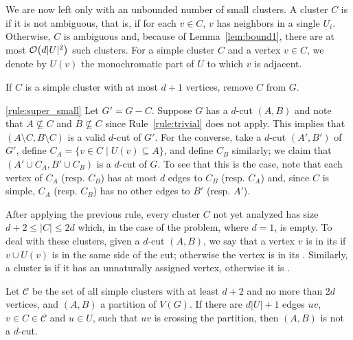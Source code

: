 We are now left only with an unbounded number of small clusters.
A cluster $C$ is  if it is not ambiguous, that is, if for each $v \in C$, $v$ has neighbors in a single $U_i$.
Otherwise, $C$ is ambiguous and, because of Lemma~\ref{lem:bound1}, there are at most $\mathcal{O}\!\left(d|U|^2\right)$ such clusters.
For a simple cluster $C$ and a vertex $v \in C$, we denote by $U(v)$ the monochromatic part of $U$ to which $v$ is adjacent.

\begin{rrule}
    \label{rule:super_small}
    If $C$ is a simple cluster with at most $d+1$ vertices, remove $C$ from $G$.
\end{rrule}

\begin{sproof}{\ref{rule:super_small}}
    Let $G' = G - C$.
    Suppose $G$ has a $d$-cut $(A,B)$ and note that $A \nsubseteq C$ and $B \nsubseteq C$ since Rule~\ref{rule:trivial} does not apply.
    This implies that $(A \setminus C, B \setminus C)$ is a valid $d$-cut of $G'$.
    For the converse, take a $d$-cut $(A', B')$ of $G'$, define $C_A = \{v \in C \mid U(v) \subseteq A\}$, and define $C_B$ similarly; we claim that $(A' \cup C_A, B' \cup C_B)$ is a $d$-cut of $G$.
    To see that this is the case, note that each vertex of $C_A$ (resp. $C_B$) has at most $d$ edges to $C_B$ (resp. $C_A$) and, since $C$ is simple, $C_A$ (resp. $C_B$) has no other edges to $B'$ (resp. $A'$).
\end{sproof}

After applying the previous rule, every cluster $C$ not yet analyzed has size $d+2 \leq |C| \leq 2d$ which, in the case of the  problem, where $d=1$, is empty.
To deal with these clusters, given a $d$-cut $(A, B)$, we say that a vertex $v$ is in its  if $v \cup U(v)$ is in the same side of the cut; otherwise the vertex is in its .
Similarly, a cluster is  if it has an unnaturally assigned vertex, otherwise it is .

\begin{observation}
    \label{obs:constrained_unnatural}
    Let $\mathcal{C}$ be the set of all simple clusters with at least $d+2$ and no more than $2d$ vertices, and $(A,B)$ a partition of $V(G)$.
    If there are $d|U|+1$ edges $uv$, $v \in C \in \mathcal{C}$ and $u \in U$, such that $uv$ is crossing the partition, then $(A,B)$ is not a $d$-cut.
\end{observation}

